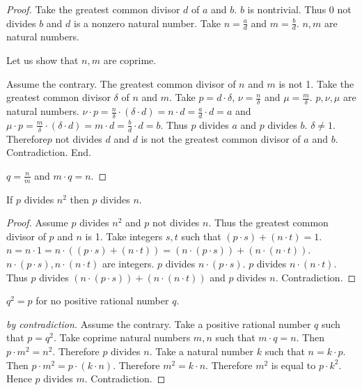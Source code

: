 \documentclass{article}
\begin{document}
\begin{forthel}
\begin{proof}
Take the greatest common divisor $d$ of $a$ and $b$. $b$ is nontrivial. Thus 0 not divides $b$ and $d$ is a nonzero natural number.
Take $n = \frac{a}{d}$ and $m = \frac{b}{d}$. $n,m$ are natural numbers.

Let us show that $n,m$ are coprime.

  Assume the contrary. The greatest common divisor of $n$ and $m$ is not 1. Take the greatest common divisor $\delta$ of $n$ and $m$.
  Take $p = d \cdot \delta$, $\nu = \frac{n}{\delta}$ and $\mu = \frac{m}{\delta}$. $p,\nu,\mu$ are natural numbers.
  $\nu \cdot p = \frac{n}{\delta} \cdot (\delta \cdot d) = n \cdot d = \frac{a}{d} \cdot d = a$ and
  $\mu \cdot p = \frac{m}{\delta} \cdot (\delta \cdot d) = m \cdot d = \frac{b}{d} \cdot d = b$.
  Thus $p$ divides $a$ and $p$ divides $b$. $\delta \neq 1$.
  Therefore$p$ not divides $d$ and $d$ is not the greatest common divisor of $a$ and $b$. Contradiction.
End.

$q = \frac{n}{m}$ and $m \cdot q = n$.
\end{proof}

    \begin{lemma}
      If $p$ divides $n^{2}$ then $p$ divides $n$.
    \end{lemma}
    \begin{proof}
      Assume $p$ divides $n^{2}$ and $p$ not divides $n$. Thus the greatest common divisor of $p$ and $n$ is 1.
      Take integers $s,t$ such that $(p \cdot s) + (n \cdot t) = 1$.
      $n = n \cdot 1 = n \cdot ((p \cdot s) + (n \cdot t)) = (n \cdot (p \cdot s)) + (n \cdot (n \cdot t))$.
      $n \cdot (p \cdot s), n \cdot (n \cdot t)$ are integers.
      $p$ divides $n \cdot (p \cdot s)$. $p$ divides $n \cdot (n \cdot t)$.
      Thus $p$ divides $(n \cdot (p \cdot s)) + (n \cdot (n \cdot t))$ and $p$ divides $n$. Contradiction.
    \end{proof}


    \begin{theorem}[Pythagoras]
      $q^{2} = p$ for no positive rational number $q$.
    \end{theorem}
    \begin{proof}[by contradiction]
      Assume the contrary.
      Take a positive rational number $q$ such that $p = q^{2}$.
      Take coprime natural numbers $m,n$ such that $m \cdot q = n$.
      Then $p \cdot m^{2} = n^{2}$.
      Therefore $p$ divides $n$.
      Take a natural number $k$ such that $n = k \cdot p$.
      Then $p \cdot m^{2} = p \cdot (k \cdot n)$.
      Therefore $m^{2} = k \cdot n$.
      Therefore $m^{2}$ is equal to $p \cdot k^{2}$.
      Hence $p$ divides $m$.
      Contradiction.
    \end{proof}
  \end{forthel}
\end{document}

